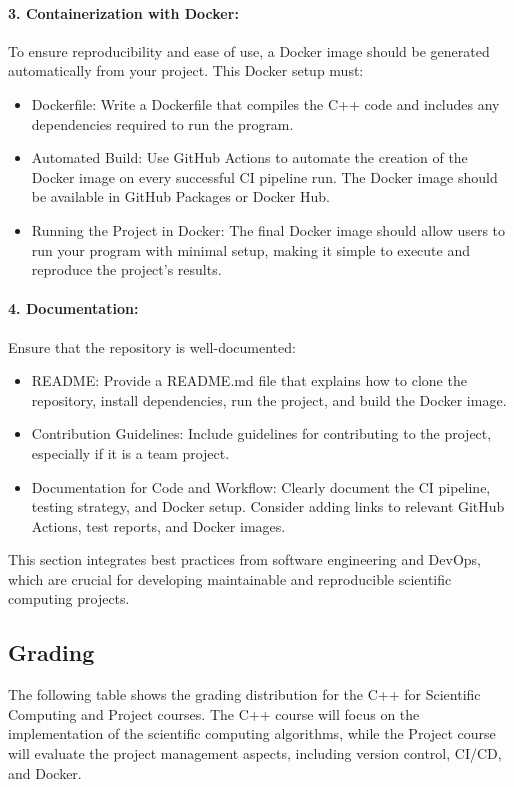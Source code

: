 \documentclass[english,10pt,a4paper]{article}
\begin{document}
\paragraph{3. Containerization with Docker:}
To ensure reproducibility and ease of use, a Docker image should be generated automatically from your project. This Docker setup must:
\begin{itemize}
\item Dockerfile: Write a Dockerfile that compiles the C++ code and includes any dependencies required to run the program.
\item Automated Build: Use GitHub Actions to automate the creation of the Docker image on every successful CI pipeline run. The Docker image should be available in GitHub Packages or Docker Hub.
\item Running the Project in Docker: The final Docker image should allow users to run your program with minimal setup, making it simple to execute and reproduce the project’s results.
\end{itemize}

\paragraph{4. Documentation:}
Ensure that the repository is well-documented:
\begin{itemize}
\item README: Provide a README.md file that explains how to clone the repository, install dependencies, run the project, and build the Docker image.
\item Contribution Guidelines: Include guidelines for contributing to the project, especially if it is a team project.
\item Documentation for Code and Workflow: Clearly document the CI pipeline, testing strategy, and Docker setup. Consider adding links to relevant GitHub Actions, test reports, and Docker images.
\end{itemize}

This section integrates best practices from software engineering and DevOps, which are crucial for developing maintainable and reproducible scientific computing projects.

\subsection{Grading}

The following table shows the grading distribution for the C++ for Scientific Computing and Project courses. 
The C++ course will focus on the implementation of the scientific computing algorithms, while the Project course will evaluate the project management aspects, including version control, CI/CD, and Docker.
\end{document}
